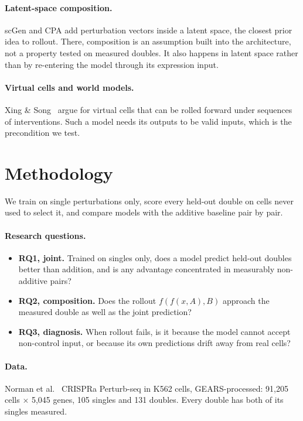 \documentclass[11pt]{article}
\begin{document}
\paragraph{Latent-space composition.} scGen and CPA add perturbation vectors inside a
latent space, the closest prior idea to rollout. There, composition is an assumption built
into the architecture, not a property tested on measured doubles. It also happens in latent
space rather than by re-entering the model through its expression input.

\paragraph{Virtual cells and world models.} Xing \& Song~\cite{xingsong} argue for virtual
cells that can be rolled forward under sequences of interventions. Such a model needs its
outputs to be valid inputs, which is the precondition we test.

\section{Methodology}

We train on single perturbations only, score every held-out double on cells never used to
select it, and compare models with the additive baseline pair by pair.

\paragraph{Research questions.}
\begin{itemize}
  \item \textbf{RQ1, joint.} Trained on singles only, does a model predict held-out doubles
  better than addition, and is any advantage concentrated in measurably non-additive pairs?
  \item \textbf{RQ2, composition.} Does the rollout $f(f(x, A), B)$ approach the measured
  double as well as the joint prediction?
  \item \textbf{RQ3, diagnosis.} When rollout fails, is it because the model cannot accept
  non-control input, or because its own predictions drift away from real cells?
\end{itemize}

\paragraph{Data.} Norman et al.~\cite{norman} CRISPRa Perturb-seq in K562 cells,
GEARS-processed: 91,205 cells $\times$ 5,045 genes, 105 singles and 131 doubles. Every
double has both of its singles measured.
\end{document}
